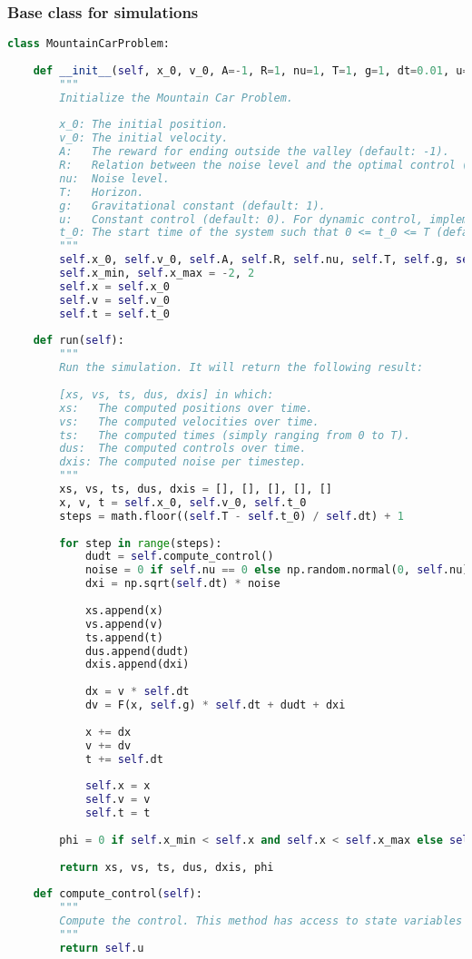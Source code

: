 \documentclass[10pt,a4paper]{article}
\begin{document}
\subsubsection{Base class for simulations}
\begin{lstlisting}[language=Python]
class MountainCarProblem:
    
    def __init__(self, x_0, v_0, A=-1, R=1, nu=1, T=1, g=1, dt=0.01, u=0, t_0=0):
        """
        Initialize the Mountain Car Problem.
        
        x_0: The initial position.
        v_0: The initial velocity.
        A:   The reward for ending outside the valley (default: -1).
        R:   Relation between the noise level and the optimal control (default: 1).
        nu:  Noise level.
        T:   Horizon.
        g:   Gravitational constant (default: 1).
        u:   Constant control (default: 0). For dynamic control, implement the compute_control method.
        t_0: The start time of the system such that 0 <= t_0 <= T (default: t_0=0).
        """
        self.x_0, self.v_0, self.A, self.R, self.nu, self.T, self.g, self.dt, self.u, self.t_0 = x_0, v_0, A, R, nu, T, g, dt, u, t_0
        self.x_min, self.x_max = -2, 2
        self.x = self.x_0
        self.v = self.v_0
        self.t = self.t_0
        
    def run(self):
        """
        Run the simulation. It will return the following result:
        
        [xs, vs, ts, dus, dxis] in which:
        xs:   The computed positions over time.
        vs:   The computed velocities over time.
        ts:   The computed times (simply ranging from 0 to T).
        dus:  The computed controls over time.
        dxis: The computed noise per timestep.
        """
        xs, vs, ts, dus, dxis = [], [], [], [], []
        x, v, t = self.x_0, self.v_0, self.t_0
        steps = math.floor((self.T - self.t_0) / self.dt) + 1
        
        for step in range(steps):
            dudt = self.compute_control()
            noise = 0 if self.nu == 0 else np.random.normal(0, self.nu)
            dxi = np.sqrt(self.dt) * noise
            
            xs.append(x)
            vs.append(v)
            ts.append(t)
            dus.append(dudt)
            dxis.append(dxi)
            
            dx = v * self.dt
            dv = F(x, self.g) * self.dt + dudt + dxi
            
            x += dx
            v += dv
            t += self.dt
            
            self.x = x
            self.v = v
            self.t = t
            
        phi = 0 if self.x_min < self.x and self.x < self.x_max else self.A
            
        return xs, vs, ts, dus, dxis, phi
        
    def compute_control(self):
        """
        Compute the control. This method has access to state variables self.x (position), self.v (velocity) and self.t (time).
        """
        return self.u
\end{lstlisting}
\end{document}
